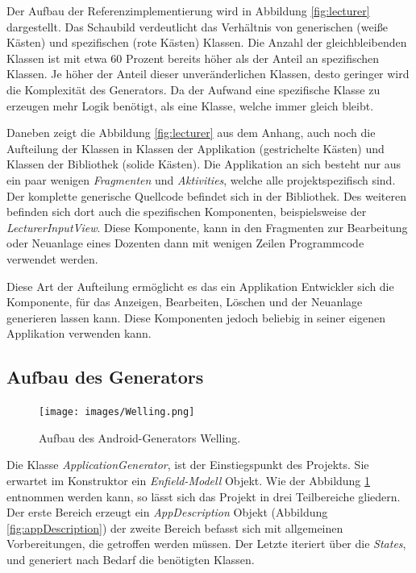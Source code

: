 \newpage

Der Aufbau der Referenzimplementierung wird in Abbildung \ref{fig:lecturer} dargestellt. Das Schaubild verdeutlicht das Verhältnis von generischen (weiße Kästen) und spezifischen (rote Kästen) Klassen. Die Anzahl der gleichbleibenden Klassen ist mit etwa 60 Prozent bereits höher als der Anteil an spezifischen Klassen. Je höher der Anteil dieser unveränderlichen Klassen, desto geringer wird die Komplexität des Generators. Da der Aufwand eine spezifische Klasse zu erzeugen mehr Logik benötigt, als eine Klasse, welche immer gleich bleibt.

Daneben zeigt die Abbildung \ref{fig:lecturer} aus dem Anhang, auch noch die Aufteilung der Klassen in Klassen der Applikation (gestrichelte Kästen) und Klassen der Bibliothek (solide Kästen). Die Applikation an sich besteht nur aus ein paar wenigen \textit{Fragmenten} und \textit{Aktivities}, welche alle projektspezifisch sind. Der komplette generische Quellcode befindet sich in der Bibliothek. Des weiteren befinden sich dort auch die spezifischen Komponenten, beispielsweise der \textit{LecturerInputView}. Diese Komponente, kann in den Fragmenten zur Bearbeitung oder Neuanlage eines Dozenten dann mit wenigen Zeilen Programmcode verwendet werden.

Diese Art der Aufteilung ermöglicht es das ein Applikation Entwickler sich die Komponente, für das Anzeigen, Bearbeiten, Löschen und der Neuanlage generieren lassen kann. Diese Komponenten jedoch beliebig in seiner eigenen Applikation verwenden kann.

\subsection{Aufbau des Generators}

\begin{figure}[H]
	\begin{center}
		\texttt{[image: images/Welling.png]}
		\caption{Aufbau des Android-Generators Welling.}
		\label{fig:welling}
	\end{center}
\end{figure}


Die Klasse \textit{ApplicationGenerator}, ist der Einstiegspunkt des Projekts. Sie erwartet im Konstruktor ein \textit{Enfield-Modell} Objekt. Wie der Abbildung \ref{fig:welling} entnommen werden kann, so lässt sich das Projekt in drei Teilbereiche gliedern. Der erste Bereich erzeugt ein \textit{AppDescription} Objekt (Abbildung \ref{fig:appDescription}) der zweite Bereich befasst sich mit allgemeinen Vorbereitungen, die getroffen werden müssen. Der Letzte iteriert über die \textit{States}, und generiert nach Bedarf die benötigten Klassen.

